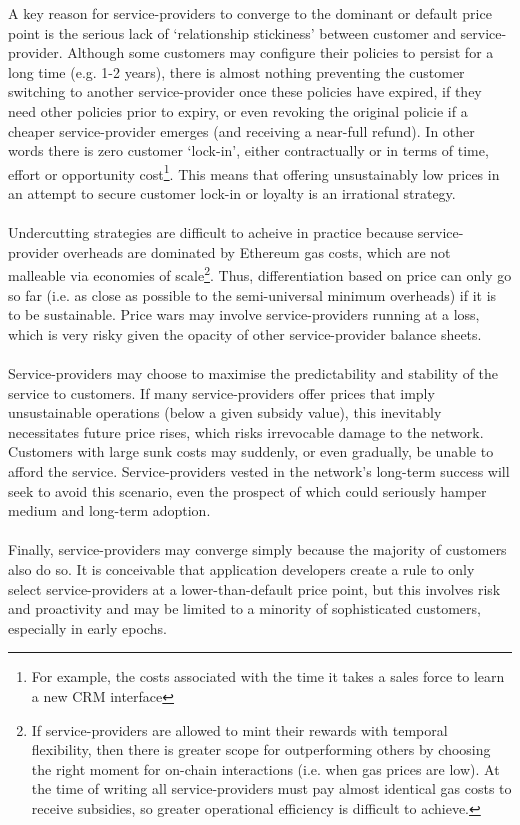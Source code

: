 \documentclass[longbibliography,nofootinbib]{revtex4-1}
\begin{document}
A key reason for service-providers to converge to the dominant or default price point is the serious lack of `relationship stickiness’ between customer and service-provider. Although some customers may configure their policies to persist for a long time (e.g. 1-2 years),  there is almost nothing preventing the customer switching to another service-provider once these policies have expired, if they need other policies prior to expiry, or even revoking the original policie if a cheaper service-provider emerges (and receiving a near-full refund). In other words there is zero customer `lock-in’, either contractually or in terms of time, effort or opportunity cost\footnote{For example, the costs associated with the time it takes a sales force to learn a new CRM interface}. This means that offering unsustainably low prices in an attempt to secure customer lock-in or loyalty is an irrational strategy.
\\\\
Undercutting strategies are difficult to acheive in practice because service-provider overheads are dominated by Ethereum gas costs, which are not malleable via economies of scale\footnote{If service-providers are allowed to mint their rewards with temporal flexibility, then there is greater scope for outperforming others by choosing the right moment for on-chain interactions (i.e. when gas prices are low). At the time of writing all service-providers must pay almost identical gas costs to receive subsidies, so greater operational efficiency is difficult to achieve.}. Thus, differentiation based on price can only go so far (i.e. as close as possible to the semi-universal minimum overheads) if it is to be sustainable. Price wars may involve service-providers running at a loss, which is very risky given the opacity of other service-provider balance sheets. 
\\\\
Service-providers may choose to maximise the predictability and stability of the service to customers. If many service-providers offer prices that imply unsustainable operations (below a given subsidy value), this inevitably necessitates future price rises, which risks irrevocable damage to the network. Customers with large sunk costs may suddenly, or even gradually, be unable to afford the service. Service-providers vested in the network's long-term success will seek to avoid this scenario, even the prospect of which could seriously hamper medium and long-term adoption.
\\\\
Finally, service-providers may converge simply because the majority of customers also do so. It is conceivable that application developers create a rule to only select service-providers at a lower-than-default price point, but this involves risk and proactivity and may be limited to a minority of sophisticated customers, especially in early epochs.



\end{document}
